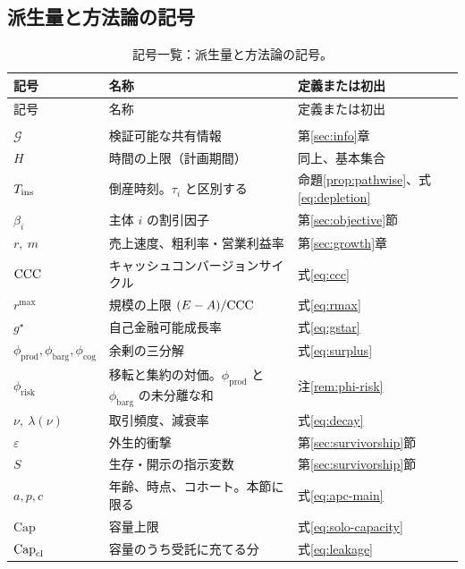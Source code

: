 \subsection*{派生量と方法論の記号}

\begin{longtable}{@{}>{\raggedright\arraybackslash}p{}>{\raggedright\arraybackslash}p{}>{\raggedright\arraybackslash}p{}@{}}
\caption{記号一覧：派生量と方法論の記号。}\label{tab:notation-derived}\\
\toprule
記号 & 名称 & 定義または初出 \\
\midrule
\endfirsthead
\toprule
記号 & 名称 & 定義または初出 \\
\midrule
\endhead
\midrule
\multicolumn{3}{r}{\footnotesize（次頁へ続く）}\\
\endfoot
\bottomrule
\endlastfoot
$\mathcal{G}$ & 検証可能な共有情報 & 第\ref{sec:info}章 \\
$H$ & 時間の上限（計画期間） & 同上、基本集合 \\
$T_{\mathrm{ins}}$ & 倒産時刻。$\tau_i$ と区別する & 命題\ref{prop:pathwise}、式\eqref{eq:depletion} \\
$\beta_i$ & 主体 $i$ の割引因子 & 第\ref{sec:objective}節 \\
$r,\ m$ & 売上速度、粗利率・営業利益率 & 第\ref{sec:growth}章 \\
$\mathrm{CCC}$ & キャッシュコンバージョンサイクル & 式\eqref{eq:ccc} \\
$r^{\max}$ & 規模の上限 $(E-A)/\mathrm{CCC}$ & 式\eqref{eq:rmax} \\
$g^\star$ & 自己金融可能成長率 & 式\eqref{eq:gstar} \\
$\phi_{\mathrm{prod}},\phi_{\mathrm{barg}},\phi_{\mathrm{cog}}$ & 余剰の三分解 & 式\eqref{eq:surplus} \\
$\phi_{\mathrm{risk}}$ & 移転と集約の対価。$\phi_{\mathrm{prod}}$ と $\phi_{\mathrm{barg}}$ の未分離な和 & 注\ref{rem:phi-risk} \\
$\nu,\ \lambda(\nu)$ & 取引頻度、減衰率 & 式\eqref{eq:decay} \\
$\varepsilon$ & 外生的衝撃 & 第\ref{sec:survivorship}節 \\
$S$ & 生存・開示の指示変数 & 第\ref{sec:survivorship}節 \\
$a,p,c$ & 年齢、時点、コホート。本節に限る & 式\eqref{eq:apc-main} \\
$\mathrm{Cap}$ & 容量上限 & 式\eqref{eq:solo-capacity} \\
$\mathrm{Cap}_{\mathrm{cl}}$ & 容量のうち受託に充てる分 & 式\eqref{eq:leakage} \\

\end{longtable}
